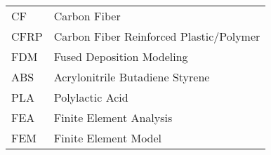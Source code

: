 
\vspace{10pt}

\begin{flushleft} 

\begin{tabular}{ll}

CF & Carbon Fiber\\
CFRP & Carbon Fiber Reinforced Plastic/Polymer\\
FDM & Fused Deposition Modeling\\
ABS & Acrylonitrile Butadiene Styrene\\
PLA & Polylactic Acid\\
FEA & Finite Element Analysis\\
FEM & Finite Element Model\\

\end{tabular}

\end{flushleft}

